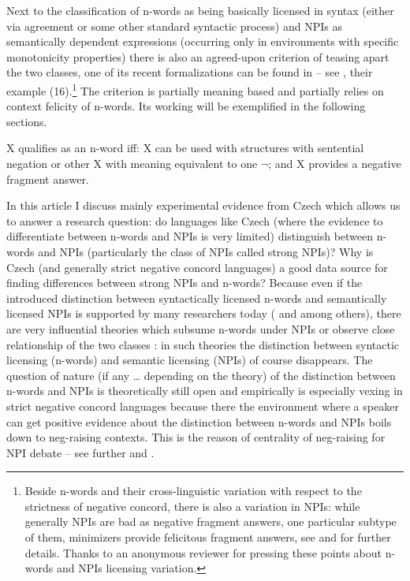 \documentclass[output=paper,
]{langscibook}
\begin{document}
\noindent Next to the classification of n-words as being basically licensed in syntax (either via agreement or some other standard syntactic process) and NPIs as semantically dependent expressions (occurring only in environments with specific monotonicity properties) there is also an agreed-upon criterion of teasing apart the two classes, one of its recent formalizations can be found in \cite{giannakidou2017landscape} -- see , their example (16).\footnote{Beside n-words and their cross-linguistic variation with respect to the strictness of negative concord, there is also a variation in NPIs: while generally NPIs are bad as negative fragment answers, one particular subtype of them, minimizers provide felicitous fragment answers, see \cite{giannakidou1998polarity} and \cite{Blasczak:2001} for further details. Thanks to an anonymous reviewer for pressing these points about n-words and NPIs licensing variation.} The criterion is partially meaning based and partially relies on context felicity of n-words. Its working will be exemplified in the following sections.

\eanoraggedright  X qualifies as an n-word iff:\label{nwords-npi-crit}
\eanoraggedright X can be used with structures with sentential negation or other X with meaning equivalent to one $\neg$; and
\ex X provides a negative fragment answer.
\z
\z

\noindent In this article I discuss mainly experimental evidence from Czech which allows us to answer a research question: do languages like Czech (where the evidence to differentiate between n-words and NPIs is very limited) distinguish between n-words and NPIs (particularly the class of NPIs called strong NPIs)? Why is Czech (and generally strict negative concord languages) a good data source for finding differences between strong NPIs and n-words? Because even if the introduced distinction between syntactically licensed n-words and semantically licensed NPIs is supported by many researchers today (\citealt{zwarts1998three,zeijlstra2004sentential} and \citealt{gajewski2011licensing} among others), there are very influential theories which subsume n-words under NPIs \citep{ladusaw1992expressing} or observe close relationship of the two classes \citep{laka1990negation}: in such theories the distinction between syntactic licensing (n-words) and semantic licensing (NPIs) of course disappears. The question of nature (if any \ldots { }depending on the theory) of the distinction between n-words and NPIs is theoretically still open and empirically is especially vexing in strict negative concord languages because there the environment where a speaker can get positive evidence about the distinction between n-words and NPIs boils down to neg-raising contexts. This is the reason of centrality of neg-raising for NPI debate -- see further  and .
\end{document}
